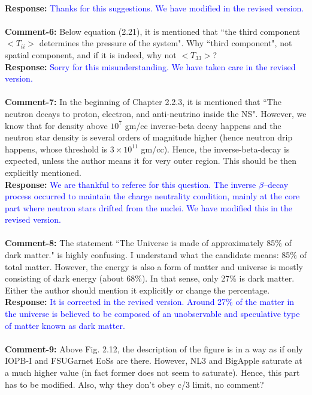 \documentclass[aps,preprint,showpacs,amsmath,amssymb,prc,floatfix,nofootinbib]{revtex4-1}
\begin{document}
\\
{\bf Response:} \textcolor{blue}{Thanks for this suggestions. We have modified in the revised version.}
\\
\\
{\bf Comment-6:} Below equation (2.21), it is mentioned that ``the third component $<T_{ii}>$ determines the pressure of the system". Why ``third component", not spatial component, and if it is indeed, why not $<T_{33}>$? 
\\
{\bf Response:} \textcolor{blue}{Sorry for this misunderstanding. We have taken care in the revised version.}
\\
\\
{\bf Comment-7:} In the beginning of Chapter 2.2.3, it is mentioned that ``The neutron decays to proton, electron, and anti-neutrino inside the NS". However, we know that for density above $10^7$ gm/cc inverse-beta decay happens and the neutron
star density is several orders of magnitude higher (hence neutron drip happens,
whose threshold is $3\times10^{11}$ gm/cc). Hence, the inverse-beta-decay is expected, unless the author means it for very outer region. This should be then explicitly mentioned.
\\
{\bf Response:} \textcolor{blue}{We are thankful to referee for this question. The inverse $\beta$--decay process occurred to maintain the charge neutrality condition, mainly at the core part where neutron stars drifted from the nuclei. We have modified this in the revised version.}
\\
\\
{\bf Comment-8:} The statement ``The Universe is made of approximately 85\% of dark
matter." is highly confusing. I understand what the candidate means: 85\% of
total matter. However, the energy is also a form of matter and universe is mostly
consisting of dark energy (about 68\%). In that sense, only 27\% is dark matter.
Either the author should mention it explicitly or change the percentage.
\\
{\bf Response:} \textcolor{blue}{It is corrected in the revised version. Around 27\% of the matter in the universe is believed to be composed of an unobservable and speculative type of matter known as dark matter.}
\\
\\
{\bf Comment-9:} Above Fig. 2.12, the description of the figure is in a way as if only IOPB-I and FSUGarnet EoSs are there. However, NL3 and BigApple saturate
at a much higher value (in fact former does not seem to saturate). Hence, this
part has to be modified. Also, why they don’t obey c/3 limit, no comment?
\end{document}
